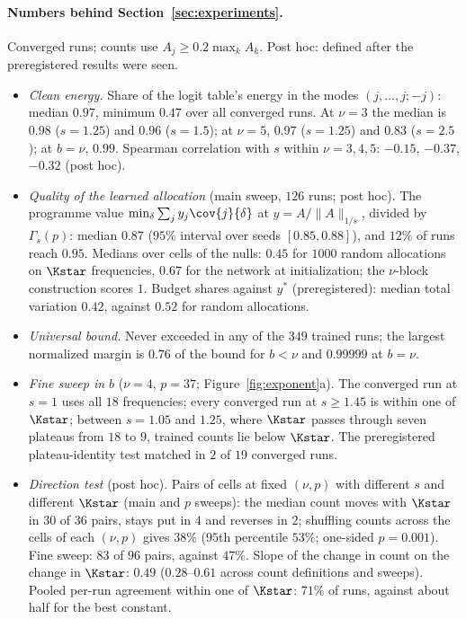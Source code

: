 \paragraph{Numbers behind Section~\ref{sec:experiments}.} Converged runs; counts use $A_j\ge0.2\max_kA_k$. Post hoc: defined after the preregistered results were seen.
\begin{itemize}
\item \emph{Clean energy.} Share of the logit table's energy in the modes $(j,\dots,j;-j)$: median $0.97$, minimum $0.47$ over all converged runs. At $\nu=3$ the median is $0.98$ ($s=1.25$) and $0.96$ ($s=1.5$); at $\nu=5$, $0.97$ ($s=1.25$) and $0.83$ ($s=2.5$); at $b=\nu$, $0.99$. Spearman correlation with $s$ within $\nu=3,4,5$: $-0.15$, $-0.37$, $-0.32$ (post hoc).
\item \emph{Quality of the learned allocation} (main sweep, $126$ runs; post hoc). The programme value $\min_\delta\sum_jy_j\cov{j}{\delta}$ at $y=A/\|A\|_{1/s}$, divided by $\Gamma_s(p)$: median $0.87$ ($95\%$ interval over seeds $[0.85,0.88]$), and $12\%$ of runs reach $0.95$. Medians over cells of the nulls: $0.45$ for $1000$ random allocations on $\Kstar$ frequencies, $0.67$ for the network at initialization; the $\nu$-block construction scores $1$. Budget shares against $y^*$ (preregistered): median total variation $0.42$, against $0.52$ for random allocations.
\item \emph{Universal bound.} Never exceeded in any of the $349$ trained runs; the largest normalized margin is $0.76$ of the bound for $b<\nu$ and $0.99999$ at $b=\nu$.
\item \emph{Fine sweep in $b$} ($\nu=4$, $p=37$; Figure~\ref{fig:exponent}a). The converged run at $s=1$ uses all $18$ frequencies; every converged run at $s\ge1.45$ is within one of $\Kstar$; between $s=1.05$ and $1.25$, where $\Kstar$ passes through seven plateaus from $18$ to $9$, trained counts lie below $\Kstar$. The preregistered plateau-identity test matched in $2$ of $19$ converged runs.
\item \emph{Direction test} (post hoc). Pairs of cells at fixed $(\nu,p)$ with different $s$ and different $\Kstar$ (main and $p$ sweeps): the median count moves with $\Kstar$ in $30$ of $36$ pairs, stays put in $4$ and reverses in $2$; shuffling counts across the cells of each $(\nu,p)$ gives $38\%$ ($95$th percentile $53\%$; one-sided $p=0.001$). Fine sweep: $83$ of $96$ pairs, against $47\%$. Slope of the change in count on the change in $\Kstar$: $0.49$ ($0.28$--$0.61$ across count definitions and sweeps). Pooled per-run agreement within one of $\Kstar$: $71\%$ of runs, against about half for the best constant.

\end{itemize}
